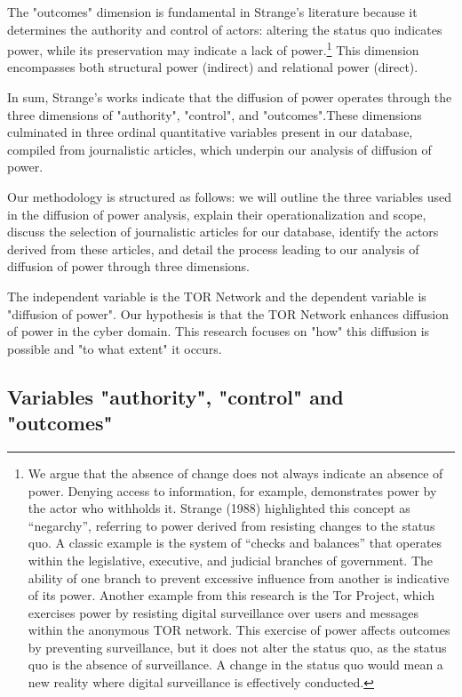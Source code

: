 The "outcomes" dimension is fundamental in Strange's literature because it determines the authority and control of actors: altering the status quo indicates power, while its preservation may indicate a lack of power.\footnote{We argue that the absence of change does not always indicate an absence of power. Denying access to information, for example, demonstrates power by the actor who withholds it. Strange (1988) highlighted this concept as “negarchy”, referring to power derived from resisting changes to the status quo. A classic example is the system of “checks and balances” that operates within the legislative, executive, and judicial branches of government. The ability of one branch to prevent excessive influence from another is indicative of its power. Another example from this research is the Tor Project, which exercises power by resisting digital surveillance over users and messages within the anonymous TOR network. This exercise of power affects outcomes by preventing surveillance, but it does not alter the status quo, as the status quo is the absence of surveillance. A change in the status quo would mean a new reality where digital surveillance is effectively conducted.} 
This dimension encompasses both structural power (indirect) and relational power (direct).

In sum, Strange's works indicate that the diffusion of power operates through the three dimensions of "authority", "control", and "outcomes".These dimensions culminated in three ordinal quantitative variables present in our database, compiled from journalistic articles, which underpin our analysis of diffusion of power.

Our methodology is structured as follows: we will outline the three variables used in the diffusion of power analysis, explain their operationalization and scope, discuss the selection of journalistic articles for our database, identify the actors derived from these articles, and detail the process leading to our analysis of diffusion of power through three dimensions.

The independent variable is the TOR Network and the dependent variable is "diffusion of power". Our hypothesis is that the TOR Network enhances diffusion of power in the cyber domain. This research focuses on "how" this diffusion is possible and "to what extent" it occurs.

\subsection{Variables "authority", "control" and "outcomes"}

